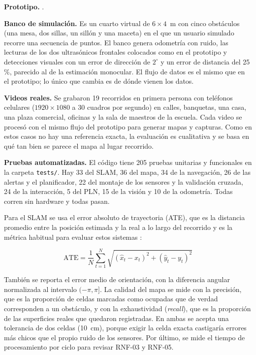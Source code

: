\textbf{Prototipo.} .

\textbf{Banco de simulación.} Es un cuarto virtual de $6 \times 4$~m con cinco
obstáculos (una mesa, dos sillas, un sillón y una maceta) en el que un usuario simulado
recorre una secuencia de puntos. El banco genera odometría con ruido, las lecturas de
los dos ultrasónicos frontales colocados como en el prototipo y detecciones visuales
con un error de dirección de $2^\circ$ y un error de distancia del 25\,\%, parecido al
de la estimación monocular. El flujo de datos es el mismo que en el prototipo; lo único
que cambia es de dónde vienen los datos.

\textbf{Videos reales.} Se grabaron 19 recorridos en primera persona con teléfonos
celulares ($1920 \times 1080$ a 30 cuadros por segundo) en calles, banquetas, una
casa, una plaza comercial, oficinas y la sala de maestros de la escuela. Cada video se
procesó con el mismo flujo del prototipo para generar mapas y capturas. Como en estos
casos no hay una referencia exacta, la evaluación es cualitativa y se basa en qué tan
bien se parece el mapa al lugar recorrido.

\textbf{Pruebas automatizadas.} El código tiene 205 pruebas unitarias y funcionales en
la carpeta \texttt{tests/}. Hay 33 del SLAM, 36 del mapa, 34 de la navegación, 26 de
las alertas y el planificador, 22 del montaje de los sensores y la validación cruzada,
24 de la interacción, 5 del PLN, 15 de la visión y 10 de la odometría. Todas corren sin hardware y
todas pasan.

Para el SLAM se usa el error absoluto de trayectoria (ATE), que es la distancia
promedio entre la posición estimada y la real a lo largo del recorrido y es la métrica
habitual para evaluar estos sistemas \cite{sturm2012tum}:

\[
\text{ATE} = \frac{1}{N}\sum_{t=1}^{N}
\sqrt{(\hat{x}_t - x_t)^2 + (\hat{y}_t - y_t)^2}
\]

También se reporta el error medio de orientación, con la diferencia angular normalizada
al intervalo $(-\pi, \pi]$. La calidad del mapa se mide con la precisión, que es la
proporción de celdas marcadas como ocupadas que de verdad corresponden a un obstáculo,
y con la exhaustividad (\emph{recall}), que es la proporción de las superficies reales
que quedaron registradas. En ambas se acepta una tolerancia de dos celdas (10~cm),
porque exigir la celda exacta castigaría errores más chicos que el propio ruido de los
sensores. Por último, se mide el tiempo de procesamiento por ciclo para revisar RNF-03
y RNF-05.


